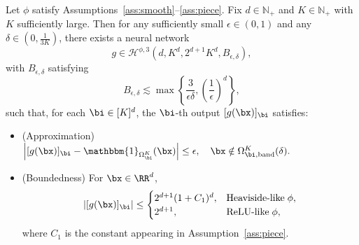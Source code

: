 \documentclass[11pt]{article}
\begin{document}
\begin{lemma}
    Let $\phi$ satisfy Assumptions~\ref{ass:smooth}--\ref{ass:piece}. Fix $d\in\mathbb{N}_{+}$ and $K\in\mathbb{N}_{+}$ with $K$ sufficiently large.
    Then for any sufficiently small $\epsilon \in (0,1)$ and any $\delta \in (0, \frac{1}{3K})$, there exists a neural network 
    \begin{equation*}
        g \in \mathcal{H}^{\phi,3} \left( d, K^d, 2^{d+1} K^d, B_{\epsilon, \delta}\right),
    \end{equation*}
    with $B_{\epsilon,\delta}$ satisfying
    \begin{equation*}
        B_{\epsilon, \delta} \lesssim \max \left\{  \frac{3}{\epsilon \delta}, \left( \frac{1}{\epsilon}\right)^d\right\},
    \end{equation*}
    such that, for each $\bi\in[K]^d$, the $\bi$-th output $[g(\bx)]_{\bi}$ satisfies:
    \begin{itemize}
        \item (Approximation) $\left|  [g(\bx)]_{\bi} - \mathbbm{1}_{\Omega_{\bi}^{K}} (\bx) \right| \leq \epsilon, \quad \bx \notin \Omega^{K}_{\bi, \mathrm{band}}(\delta).$
        \item (Boundedness) For $\bx \in \RR^d$,
        \begin{equation}
            |[g(\bx)]_{\bi}| \le 
            \begin{cases}
                2^{d+1} (1+ C_1)^d, & \textrm{Heaviside-like} \; \phi ,\\
                2^{d+1}, & \textrm{ReLU-like} \; \phi,
            \end{cases}  
            \label{eq:dD_indicator_bound}
        \end{equation}
        where $C_1$ is the constant appearing in Assumption~\ref{ass:piece}.
    \end{itemize}
    \label{lem:dD_indicator_app}
\end{lemma}
\end{document}
